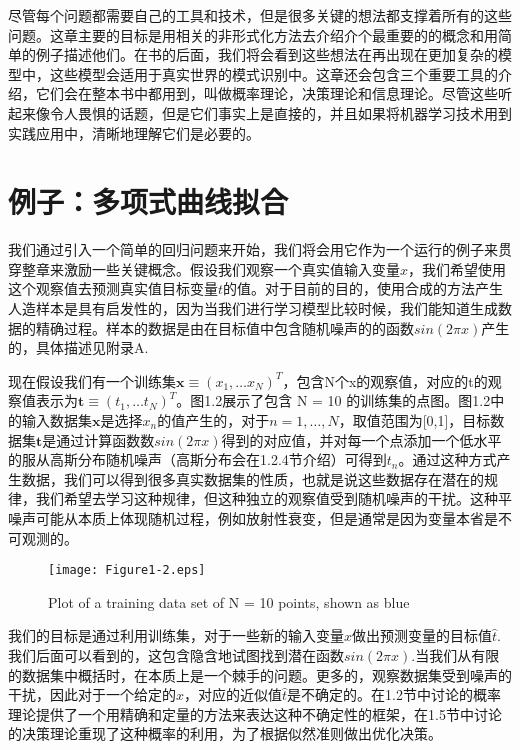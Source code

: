 	尽管每个问题都需要自己的工具和技术，但是很多关键的想法都支撑着所有的这些问题。这章主要的目标是用相关的非形式化方法去介绍介个最重要的的概念和用简单的例子描述他们。在书的后面，我们将会看到这些想法在再出现在更加复杂的模型中，这些模型会适用于真实世界的模式识别中。这章还会包含三个重要工具的介绍，它们会在整本书中都用到，叫做概率理论，决策理论和信息理论。尽管这些听起来像令人畏惧的话题，但是它们事实上是直接的，并且如果将机器学习技术用到实践应用中，清晰地理解它们是必要的。
	
{ \color{blue} \section{例子：多项式曲线拟合} }
	我们通过引入一个简单的回归问题来开始，我们将会用它作为一个运行的例子来贯穿整章来激励一些关键概念。假设我们观察一个真实值输入变量$x$，我们希望使用这个观察值去预测真实值目标变量$t$的值。对于目前的目的，使用合成的方法产生人造样本是具有启发性的，因为当我们进行学习模型比较时候，我们能知道生成数据的精确过程。样本的数据是由在目标值中包含随机噪声的的函数$sin(2 \pi x)$产生的，具体描述见附录A.

	现在假设我们有一个训练集$\mathbf{x} \equiv (x_1, \dots x_N)^T $，包含N个x的观察值，对应的t的观察值表示为$\mathbf{t} \equiv (t_1, \dots t_N)^T $。图1.2展示了包含 N = 10 的训练集的点图。图1.2中的输入数据集$\mathbf{x}$是选择$x_n$的值产生的，对于$n = 1, \dots ,N$，取值范围为[0,1]，目标数据集$\mathbf{t}$是通过计算函数数$sin(2 \pi x)$得到的对应值，并对每一个点添加一个低水平的服从高斯分布随机噪声（高斯分布会在1.2.4节介绍）可得到$t_n$。通过这种方式产生数据，我们可以得到很多真实数据集的性质，也就是说这些数据存在潜在的规律，我们希望去学习这种规律，但这种独立的观察值受到随机噪声的干扰。这种平噪声可能从本质上体现随机过程，例如放射性衰变，但是通常是因为变量本省是不可观测的。
	
\begin{figure}
	\parbox{.4\textwidth}{\caption{Plot of a training data set of N = 10 points, shown as blue}}
	\parbox{.5\textwidth}{\texttt{[image: Figure1-2.eps]}}
\end{figure}

	我们的目标是通过利用训练集，对于一些新的输入变量$\hat{x}$做出预测变量的目标值$\hat{t}$.我们后面可以看到的，这包含隐含地试图找到潜在函数$sin(2 \pi x)$.当我们从有限的数据集中概括时，在本质上是一个棘手的问题。更多的，观察数据集受到噪声的干扰，因此对于一个给定的$\hat{x}$，对应的近似值$\hat{t}$是不确定的。在1.2节中讨论的概率理论提供了一个用精确和定量的方法来表达这种不确定性的框架，在1.5节中讨论的决策理论重现了这种概率的利用，为了根据似然准则做出优化决策。
	
